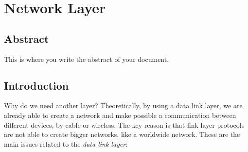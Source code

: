 \chapter[Network Layer]{Network Layer}

\section*{Abstract}         %
This is where you write the abstract of your document.

\section{Introduction}
Why do we need another layer? Theoretically, by using a data link layer, we are already able to create a network and make possible a communication between different devices, by cable or wireless. The key reason is that link layer protocols are not able to create bigger networks, like a worldwide network. These are the main issues related to the \textit{data link layer}:
